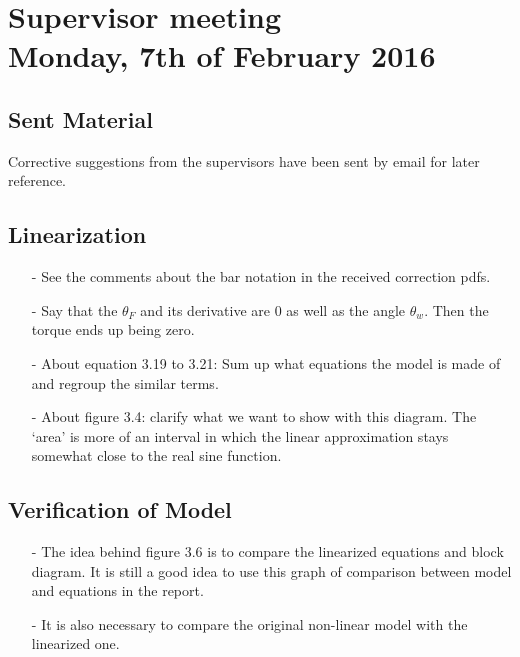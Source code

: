 

\renewcommand\chaptername{KAPITEL}
\renewcommand\contentsname{Indhold}
\renewcommand\figurename{Figur}
\renewcommand\tablename{Tabel}

\section*{Supervisor meeting\\ \small Monday, 7th of February 2016}

\subsection{Sent Material}
Corrective suggestions from the supervisors have been sent by email for later reference.

\subsection{Linearization}
\begin{itemize}
  \item[-] See the comments about the bar notation in the received correction pdfs.
  \item[-] Say that the $\theta_F$ and its derivative are 0 as well as the angle $\theta_w$. Then the torque ends up being zero.
  \item[-] About equation 3.19 to 3.21: Sum up what equations the model is made of and regroup the similar terms.
  \item[-] About figure 3.4: clarify what we want to show with this diagram. The `area' is more of an interval in which the linear approximation stays somewhat close to the real sine function.
\end{itemize}

\subsection{Verification of Model}
\begin{itemize}
  \item[-] The idea behind figure 3.6 is to compare the linearized equations and block diagram. It is still a good idea to use this graph of comparison between model and equations in the report.
  \item[-] It is also necessary to compare the original non-linear model with the linearized one.
\end{itemize}

